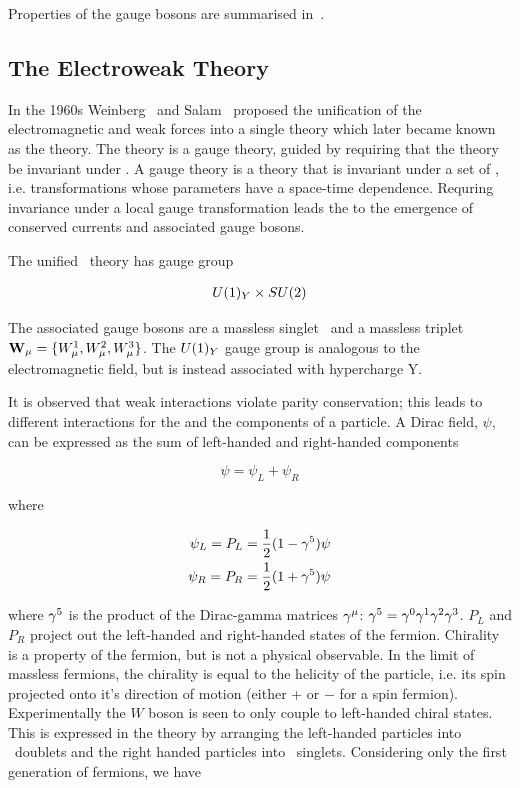 Properties of the gauge bosons are summarised in~.

\subsection{The Electroweak Theory}

In the 1960s Weinberg~\cite{PhysRevLett.19.1264} and Salam~\cite{Salam1964168} proposed the unification of the electromagnetic
and weak forces into a single theory which later became known as the
 theory. The theory is a gauge theory, guided by requiring that the theory be
invariant under . A gauge theory is a theory
that is invariant under a set of , i.e.
transformations whose parameters have a space-time dependence. Requring
invariance under a local gauge transformation leads the to the emergence of
conserved currents and associated gauge bosons.

The unified \ew\ theory has gauge group

\begin{align}
U(1)_{Y} \times SU(2) 
\end{align}

The associated gauge bosons are a massless singlet \Bmu\ and a massless triplet
$\mathbf{W_{\mu}} = \{W^{1}_{\mu}, W^{2}_{\mu}, W^{3}_{\mu}\}$. The $U(1)_{Y}$ gauge group is analogous to the
electromagnetic field, but is instead associated with hypercharge Y.

It is observed that weak interactions violate parity conservation; this leads to
different interactions for the  and the 
components of a particle. A Dirac field, $\psi$, can be expressed as the sum of 
left-handed and right-handed components

\begin{equation}
\psi = \psi_{L} + \psi_{R}
\end{equation}

where

\begin{align}
\psi_{L} = P_{L} = \frac{1}{2} (1 - \gammafive) \psi \\
\psi_{R} = P_{R} = \frac{1}{2} (1 + \gammafive) \psi \\
\end{align}

where $\gamma^{5}$ is the product of the Dirac-gamma matrices $\gamma^{\mu}$:
$\gamma^{5} = \gamma^{0}\gamma^{1}\gamma^{2}\gamma^{3}$. $P_{L}$ and $P_{R}$
project out the left-handed and right-handed  states of the
fermion. Chirality is a property of the fermion, but is not a physical
observable. In the limit of massless fermions, the chirality is equal to the
helicity of the particle, i.e. its spin projected onto it's direction of
motion (either + or $-$ for a spin 
fermion). Experimentally the $W$ boson is seen to only couple to left-handed
chiral states. This is expressed in the theory by arranging the left-handed
particles into \sutwo\ doublets and the right handed particles into \sutwo\
singlets. Considering only the first generation of fermions, we have

